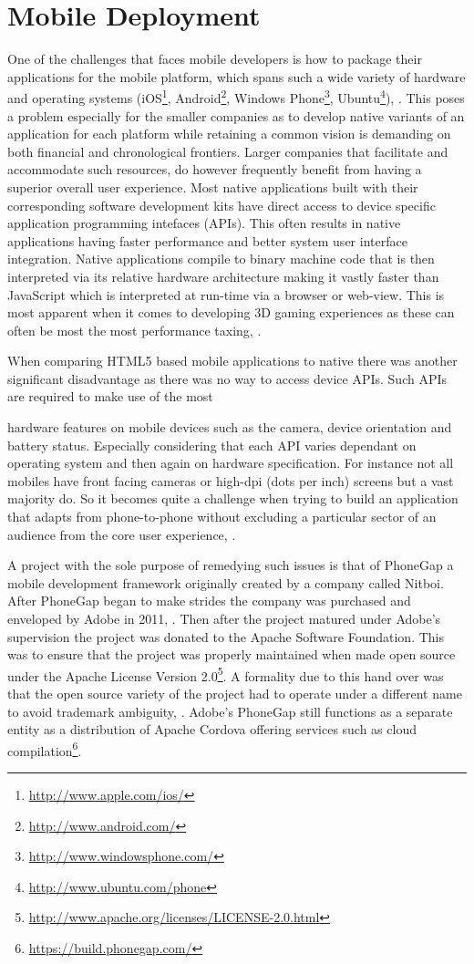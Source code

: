 \documentclass[final]{cmpreport}
\begin{document}
\section{Mobile Deployment}
One of the challenges that faces mobile developers is how to package their applications for the mobile platform, which spans such a wide variety of hardware and operating systems (iOS\footnote{\url{http://www.apple.com/ios/}}, Android\footnote{\url{http://www.android.com/}}, Windows Phone\footnote{\url{http://www.windowsphone.com/}}, Ubuntu\footnote{\url{http://www.ubuntu.com/phone}}), \cite{Feijoo}. This poses a problem especially for the smaller companies as to develop native variants of an application for each platform while retaining a common vision is demanding on both financial and chronological frontiers. Larger companies that facilitate and accommodate such resources, do however frequently benefit from having a superior overall user experience. Most native applications built with their corresponding software development kits have direct access to device specific  application programming intefaces (APIs). This often results in native applications having faster performance and better system user interface integration. Native applications compile to binary machine code that is then interpreted via its relative hardware architecture making it vastly faster than JavaScript which is interpreted at run-time via a browser or web-view. This is most apparent when it comes to developing 3D gaming experiences as these can often be most the most performance taxing, \cite{Kulloli}.

When comparing HTML5 based mobile applications to native there was another significant disadvantage as there was no way to access device APIs. Such APIs are required to make use of the most 

 hardware features on mobile devices such as the camera, device orientation and battery status. Especially considering that each API varies dependant on operating system and then again on hardware specification. For instance not all mobiles have front facing cameras or high-dpi (dots per inch) screens but a vast majority do. So it becomes quite a challenge when trying to build an application that adapts from phone-to-phone without excluding a particular sector of an audience from the core user experience, \cite{Charland}.

A project with the sole purpose of remedying such issues is that of PhoneGap a mobile development framework originally created by a company called Nitboi. After PhoneGap began to make strides the company was purchased and enveloped by Adobe in 2011, \cite{Adobe}. Then after the project matured under Adobe's supervision the project was donated to the Apache Software Foundation. This was to ensure that the project was properly maintained when made open source under the Apache License Version 2.0\footnote{\url{http://www.apache.org/licenses/LICENSE-2.0.html}}. A formality due to this hand over was that the open source variety of the project had to operate under a different name to avoid trademark ambiguity, \cite{Leroux}. Adobe's PhoneGap still functions as a separate entity as a distribution of Apache Cordova offering services such as cloud compilation\footnote{\url{https://build.phonegap.com/}}.
\end{document}
